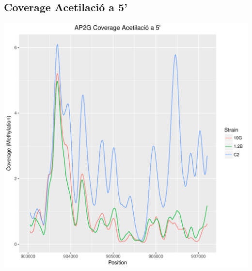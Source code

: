 \documentclass{article}\usepackage[]{graphicx}\usepackage[]{color}
\newenvironment{knitrout}{}{} %
\begin{document}
\subsection{Coverage Acetilació a 5'}
\begin{knitrout}
\color{fgcolor}
\includegraphics[width=1\linewidth]{figure/plot_ac_5-1} 

\end{knitrout}
\clearpage
\end{document}
